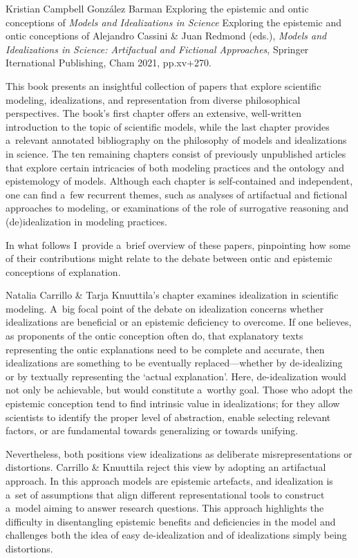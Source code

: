 \begin{recengenv}{Kristian Campbell González Barman}
	{Exploring the epistemic and ontic conceptions of \textit{Models and Idealizations in Science}}
	{Exploring the epistemic and ontic conceptions of }
	{Alejandro Cassini \& Juan Redmond (eds.), \textit{Models and Idealizations in Science: Artifactual and Fictional Approaches}, Springer Iternational Publishing, Cham 2021, pp.xv+270.}


This book presents an insightful collection of papers that explore scientific modeling, idealizations, and representation from diverse philosophical perspectives. The book's first chapter offers an extensive, well-written introduction to the topic of scientific models, while the last chapter provides a~relevant annotated bibliography on the philosophy of models and idealizations in science. The ten remaining chapters consist of previously unpublished articles that explore certain intricacies of both modeling practices and the ontology and epistemology of models. Although each chapter is self-contained and independent, one can find a~few recurrent themes, such as analyses of artifactual and fictional approaches to modeling, or examinations of the role of surrogative reasoning and (de)idealization in modeling practices.

In what follows I~provide a~brief overview of these papers, pinpointing how some of their contributions might relate to the debate between ontic and epistemic conceptions of explanation.

Natalia Carrillo \& Tarja Knuuttila's chapter examines idealization in scientific modeling. A~big focal point of the debate on idealization concerns whether idealizations are beneficial or an epistemic deficiency to overcome. If one believes, as proponents of the ontic conception often do, that explanatory texts representing the ontic explanations need to be complete and accurate, then idealizations are something to be eventually replaced---whether by de-idealizing or by textually representing the ‘actual explanation'. Here, de-idealization would not only be achievable, but would constitute a~worthy goal. Those who adopt the epistemic conception tend to find intrinsic value in idealizations; for they allow scientists to identify the proper level of abstraction, enable selecting relevant factors, or are fundamental towards generalizing or towards unifying.

Nevertheless, both positions view idealizations as deliberate misrepresentations or distortions. Carrillo \& Knuuttila reject this view by adopting an artifactual approach. In this approach models are epistemic artefacts, and idealization is a~set of assumptions that align different representational tools to construct a~model aiming to answer research questions. This approach highlights the difficulty in disentangling epistemic benefits and deficiencies in the model and challenges both the idea of easy de-idealization and of idealizations simply being distortions.


\end{recengenv}

